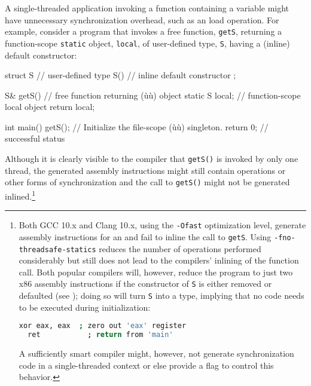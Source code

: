 A single-threaded application invoking a function containing a
  variable might
have unnecessary synchronization overhead, such as an 
load operation. For example, consider a program that invokes a free
function, \lstinline!getS!, returning a function-scope \lstinline!static!
object, \lstinline!local!, of user-defined type, \lstinline!S!, having a
 (inline) default constructor:

\begin{emcppslisting}
struct S  // user-defined type
{
    S() { }  // inline default constructor
};

S& getS()  // free function returning (ù{}ù) object
{
    static S local;  // function-scope local object
    return local;
}

int main()
{
    getS();    // Initialize the file-scope (ù{}ù) singleton.
    return 0;  // successful status
}
\end{emcppslisting}

\noindent Although it is clearly visible to the compiler that \lstinline!getS()! is
invoked by only one thread, the generated assembly instructions might
still contain  operations or other forms of
synchronization and the call to \lstinline!getS()! might not be generated
inlined.{\cprotect\footnote{Both GCC 10.x and Clang 10.x, using the
\lstinline!-Ofast! optimization level, generate assembly instructions for
an  and fail to inline the call
to \lstinline!getS!. Using \lstinline!-fno-threadsafe-statics! reduces the
number of operations performed considerably but still does not lead to
the compilers' inlining of the function call. Both popular compilers
will, however, reduce the program to just two x86 assembly
instructions if the  constructor of \lstinline!S!
  is either removed or defaulted (see );
  doing so will turn \lstinline!S! into a 
  type, implying that no code needs to be executed during
  initialization:

  \begin{lstlisting}[language=bash,basicstyle={\ttfamily\footnotesize}]
  xor eax, eax  ; zero out 'eax' register
  ret           ; return from 'main'
  \end{lstlisting}

\noindent A sufficiently smart compiler might, however, not generate
  synchronization code in a single-threaded context or else provide a
  flag to control this behavior.

  }}

